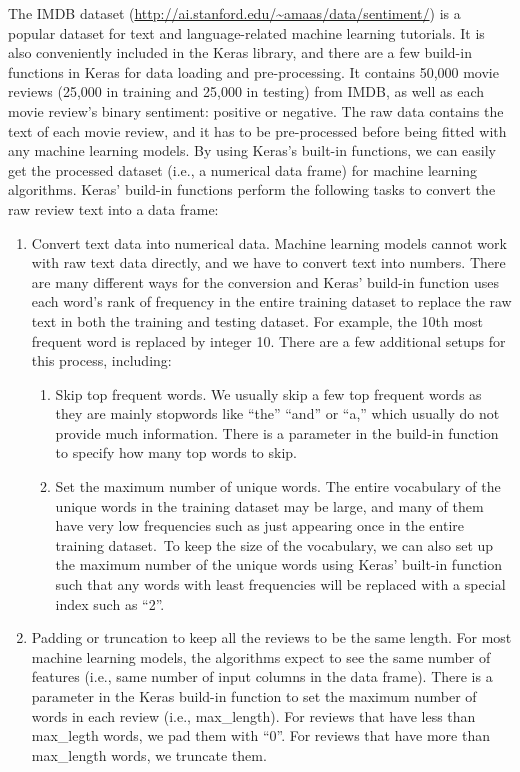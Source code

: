 \documentclass[12pt,]{krantz}
\providecommand{\tightlist}{%
  \setlength{\itemsep}{0pt}\setlength{\parskip}{0pt}}
\begin{document}
The IMDB dataset (\url{http://ai.stanford.edu/~amaas/data/sentiment/}) is a popular dataset for text and language-related machine learning tutorials. It is also conveniently included in the Keras library, and there are a few build-in functions in Keras for data loading and pre-processing. It contains 50,000 movie reviews (25,000 in training and 25,000 in testing) from IMDB, as well as each movie review's binary sentiment: positive or negative. The raw data contains the text of each movie review, and it has to be pre-processed before being fitted with any machine learning models. By using Keras's built-in functions, we can easily get the processed dataset (i.e., a numerical data frame) for machine learning algorithms. Keras' build-in functions perform the following tasks to convert the raw review text into a data frame:

\begin{enumerate}
\def\labelenumi{\arabic{enumi}.}
\tightlist
\item
  Convert text data into numerical data. Machine learning models cannot work with raw text data directly, and we have to convert text into numbers. There are many different ways for the conversion and Keras' build-in function uses each word's rank of frequency in the entire training dataset to replace the raw text in both the training and testing dataset. For example, the 10th most frequent word is replaced by integer 10. There are a few additional setups for this process, including:

  \begin{enumerate}
  \def\labelenumii{\alph{enumii}.}
  \tightlist
  \item
    Skip top frequent words. We usually skip a few top frequent words as they are mainly stopwords like ``the'' ``and'' or ``a,'' which usually do not provide much information. There is a parameter in the build-in function to specify how many top words to skip.\\
  \item
    Set the maximum number of unique words. The entire vocabulary of the unique words in the training dataset may be large, and many of them have very low frequencies such as just appearing once in the entire training dataset.~To keep the size of the vocabulary, we can also set up the maximum number of the unique words using Keras' built-in function such that any words with least frequencies will be replaced with a special index such as ``2''.
  \end{enumerate}
\item
  Padding or truncation to keep all the reviews to be the same length. For most machine learning models, the algorithms expect to see the same number of features (i.e., same number of input columns in the data frame). There is a parameter in the Keras build-in function to set the maximum number of words in each review (i.e., max\_length). For reviews that have less than max\_legth words, we pad them with ``0''. For reviews that have more than max\_length words, we truncate them.
\end{enumerate}
\end{document}
